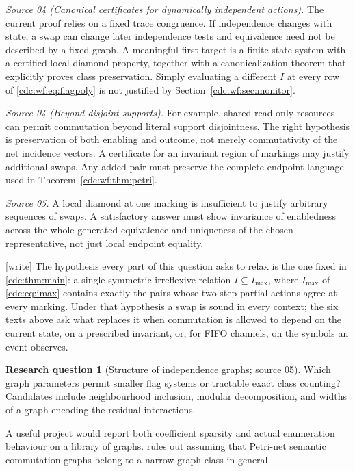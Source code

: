 \documentclass[11pt,a4paper]{article}
\theoremstyle{definition}
\newtheorem{question}[question]{Research question}
\theoremstyle{remark}
\newcommand{\wtag}{\textup{[write]}}%
\begin{document}
\emph{Source 04 (Canonical certificates for dynamically independent actions).} The current proof relies on a fixed trace congruence. If independence changes with state, a swap can change later independence tests and equivalence need not be described by a fixed graph. A meaningful first target is a finite-state system with a certified local diamond property, together with a canonicalization theorem that explicitly proves class preservation. Simply evaluating a different $I$ at every row of \eqref{cdc:wf:eq:flagpoly} is not justified by Section~\ref{cdc:wf:sec:monitor}.

\emph{Source 04 (Beyond disjoint supports).} For example, shared read-only resources can permit commutation beyond literal support disjointness. The right hypothesis is preservation of both enabling and outcome, not merely commutativity of the net incidence vectors. A certificate for an invariant region of markings may justify additional swaps. Any added pair must preserve the complete endpoint language used in Theorem~\ref{cdc:wf:thm:petri}.

\emph{Source 05.} A local diamond at one marking is insufficient to justify arbitrary sequences of swaps. A satisfactory answer must show invariance of enabledness across the whole generated equivalence and uniqueness of the chosen representative, not just local endpoint equality.

\wtag{} The hypothesis every part of this question asks to relax is the
one fixed in \cref{cdc:thm:main}: a single symmetric irreflexive relation
$I\subseteq I_{\max}$, where $I_{\max}$ of \eqref{cdc:eq:imax} contains
exactly the pairs whose two-step partial actions agree at every marking.
Under that hypothesis a swap is sound in every context; the six texts
above ask what replaces it when commutation is allowed to depend on the
current state, on a prescribed invariant, or, for FIFO channels, on the
symbols an event observes.

\begin{question}[Structure of independence graphs; source 05]
Which graph parameters permit smaller flag systems or tractable exact class counting? Candidates include neighbourhood inclusion, modular decomposition, and widths of a graph encoding the residual interactions.
\end{question}
A useful project would report both coefficient sparsity and actual enumeration behaviour on a library of graphs.  rules out assuming that Petri-net semantic commutation graphs belong to a narrow graph class in general.
\end{document}
